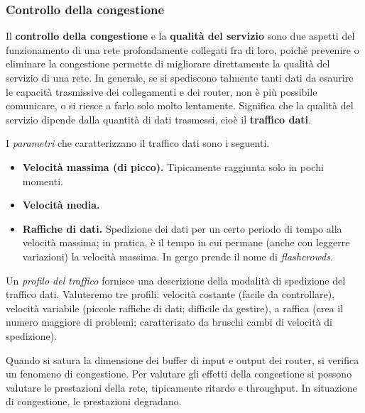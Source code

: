     \subsubsection{Controllo della congestione}
    
        Il \textbf{controllo della congestione} e la \textbf{qualità del servizio} sono due aspetti del funzionamento di una rete profondamente collegati fra di loro, poiché prevenire o eliminare la congestione permette di migliorare direttamente la qualità del servizio di una rete. In generale, se si spediscono talmente tanti dati da esaurire le capacità trasmissive dei collegamenti e dei router, non è più possibile comunicare, o si riesce a farlo solo molto lentamente. Significa che la qualità del servizio dipende dalla quantità di dati trasmessi, cioè il \textbf{traffico dati}.
        
        \vspace{3mm}
        
        I \textit{parametri} che caratterizzano il traffico dati sono i seguenti.
        
        \begin{itemize}
            \item 
                \textbf{Velocità massima (di picco).} Tipicamente raggiunta solo in pochi momenti.
            
            \item
                \textbf{Velocità media.}
                
            \item
               \textbf{Raffiche di dati.} Spedizione dei dati per un certo periodo di tempo alla velocità massima; in pratica, è il tempo in cui permane (anche con leggerre variazioni) la velocità massima. In gergo prende il nome di \textit{flashcrowds}.
        \end{itemize}
        
        Un \textit{profilo del traffico} fornisce una descrizione della modalità di spedizione del traffico dati. Valuteremo tre profili: velocità costante (facile da controllare), velocità variabile (piccole raffiche di dati; difficile da gestire), a raffica (crea il numero maggiore di problemi; caratterizato da bruschi cambi di velocità di spedizione).
        
        \vspace{3mm}
        
        Quando si satura la dimensione dei buffer di input e output dei router, si verifica un fenomeno di congestione. Per valutare gli effetti della congestione si possono valutare le prestazioni della rete, tipicamente ritardo e throughput. In situazione di congestione, le prestazioni degradano.
        
